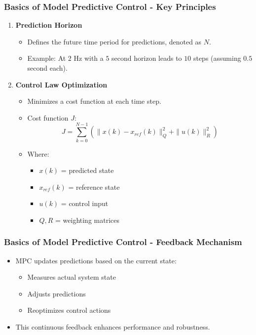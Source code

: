 \documentclass[aspectratio=169]{beamer}
\begin{document}
\begin{frame}[fragile]
    \frametitle{Basics of Model Predictive Control - Key Principles}
    \begin{enumerate}
        \item \textbf{Prediction Horizon}
        \begin{itemize}
            \item Defines the future time period for predictions, denoted as \(N\).
            \item Example: At \(2\) Hz with a \(5\) second horizon leads to \(10\) steps (assuming \(0.5\) second each).
        \end{itemize}
        
        \item \textbf{Control Law Optimization}
        \begin{itemize}
            \item Minimizes a cost function at each time step.
            \item Cost function \(J\):
            \begin{equation}
                J = \sum_{k=0}^{N-1} \left( \|x(k) - x_{ref}(k)\|^2_Q + \|u(k)\|^2_R \right)
            \end{equation}
            \item Where:
            \begin{itemize}
                \item \(x(k)\) = predicted state
                \item \(x_{ref}(k)\) = reference state
                \item \(u(k)\) = control input
                \item \(Q, R\) = weighting matrices
            \end{itemize}
        \end{itemize}
    \end{enumerate}
\end{frame}

\begin{frame}[fragile]
    \frametitle{Basics of Model Predictive Control - Feedback Mechanism}
    \begin{itemize}
        \item MPC updates predictions based on the current state: 
        \begin{itemize}
            \item Measures actual system state
            \item Adjusts predictions
            \item Reoptimizes control actions
        \end{itemize}
        \item This continuous feedback enhances performance and robustness.
    \end{itemize}
\end{frame}
\end{document}
